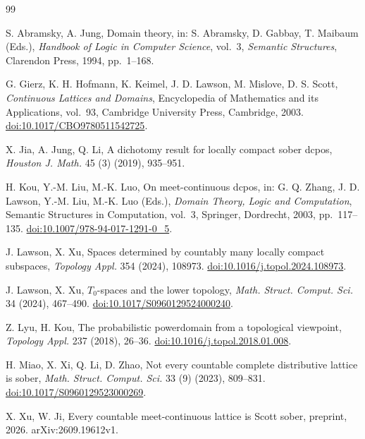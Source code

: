 \documentclass[11pt,reqno]{amsart}
\theoremstyle{definition}
\theoremstyle{remark}
\numberwithin{equation}{section}
\begin{document}
\begin{thebibliography}{99}
\raggedright
{}
S. Abramsky, A. Jung,
Domain theory,
in: S. Abramsky, D. Gabbay, T. Maibaum (Eds.),
\emph{Handbook of Logic in Computer Science}, vol.~3,
\emph{Semantic Structures}, Clarendon Press, 1994, pp.~1--168.

G. Gierz, K. H. Hofmann, K. Keimel, J. D. Lawson, M. Mislove, D. S. Scott,
\emph{Continuous Lattices and Domains},
Encyclopedia of Mathematics and its Applications, vol.~93,
Cambridge University Press, Cambridge, 2003.
\href{https://doi.org/10.1017/CBO9780511542725}{doi:10.1017/CBO9780511542725}.

X. Jia, A. Jung, Q. Li,
A dichotomy result for locally compact sober dcpos,
\emph{Houston J. Math.} 45 (3) (2019), 935--951.


H. Kou, Y.-M. Liu, M.-K. Luo,
On meet-continuous dcpos,
in: G. Q. Zhang, J. D. Lawson, Y.-M. Liu, M.-K. Luo (Eds.),
\emph{Domain Theory, Logic and Computation},
Semantic Structures in Computation, vol.~3,
Springer, Dordrecht, 2003, pp.~117--135.
\href{https://doi.org/10.1007/978-94-017-1291-0_5}{doi:10.1007/978-94-017-1291-0\_5}.

J. Lawson, X. Xu,
Spaces determined by countably many locally compact subspaces,
\emph{Topology Appl.} 354 (2024), 108973.
\href{https://doi.org/10.1016/j.topol.2024.108973}{doi:10.1016/j.topol.2024.108973}.

J. Lawson, X. Xu,
$T_0$-spaces and the lower topology,
\emph{Math. Struct. Comput. Sci.} 34 (2024), 467--490.
\href{https://doi.org/10.1017/S0960129524000240}{doi:10.1017/S0960129524000240}.


Z. Lyu, H. Kou,
The probabilistic powerdomain from a topological viewpoint,
\emph{Topology Appl.} 237 (2018), 26--36.
\href{https://doi.org/10.1016/j.topol.2018.01.008}{doi:10.1016/j.topol.2018.01.008}.


H. Miao, X. Xi, Q. Li, D. Zhao,
Not every countable complete distributive lattice is sober,
\emph{Math. Struct. Comput. Sci.} 33 (9) (2023), 809--831.
\href{https://doi.org/10.1017/S0960129523000269}{doi:10.1017/S0960129523000269}.

X. Xu, W. Ji,
Every countable meet-continuous lattice is Scott sober,
preprint, 2026. arXiv:2609.19612v1.

\end{thebibliography}
\end{document}
